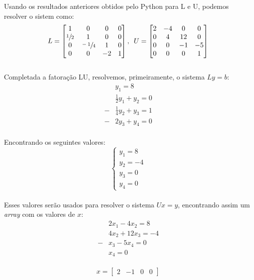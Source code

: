 Usando os resultados anteriores obtidos pelo Python para L e U, podemos resolver o sistem como:
\\

\[
    L = \begin{bmatrix}
        1            & 0             & 0  & 0 \\
        \sfrac{1}{2} & 1             & 0  & 0 \\
        0            & \sfrac{-1}{4} & 1  & 0 \\
        0            & 0             & -2 & 1
    \end{bmatrix}, \hspace{.5em}
    U = \begin{bmatrix}
        2 & -4 & 0  & 0  \\
        0 & 4  & 12 & 0  \\
        0 & 0  & -1 & -5 \\
        0 & 0  & 0  & 1
    \end{bmatrix}
\]
\\

Completada a fatoração LU, resolvemos, primeiramente, o sistema $Ly=b$:
\\

\[
    \begin{aligned}
          & y_1 = 8                  \\
          & \frac{1}{2}y_1 + y_2 = 0 \\
        - & \frac{1}{4}y_2+y_3 = 1   \\
        - & 2y_3+y_4 = 0
    \end{aligned}
\]
\\

Encontrando os seguintes valores:
\\

\[
    \begin{cases}
        y_1 = 8  \\
        y_2 = -4 \\
        y_3 = 0  \\
        y_4 = 0
    \end{cases}
\]
\\

Esses valores serão usados para resolver o sistema $Ux=y$, encontrando assim um \textit{array} com os valores de $x$:
\\

\[
    \begin{aligned}
          & 2x_1 - 4x_2= 8    \\
          & 4x_2 + 12x_3 = -4 \\
        - & x_3 - 5x_4 = 0    \\
          & x_4  = 0
    \end{aligned}
\]
\\

\begin{equation}
    x =\begin{bmatrix}
        2 & -1 & 0 & 0
    \end{bmatrix}
\end{equation}
